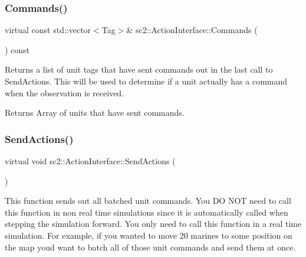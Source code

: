 \subsubsection{\texorpdfstring{Commands()}{Commands()}}
{\footnotesize\ttfamily virtual const std\+::vector$<$Tag$>$\& sc2\+::\+Action\+Interface\+::\+Commands (\begin{DoxyParamCaption}{ }\end{DoxyParamCaption}) const\hspace{0.3cm}{\ttfamily [pure virtual]}}

Returns a list of unit tags that have sent commands out in the last call to Send\+Actions. This will be used to determine if a unit actually has a command when the observation is received. \begin{DoxyReturn}{Returns}
Array of units that have sent commands. 
\end{DoxyReturn}
\mbox{\label{classsc2_1_1_action_interface_af054d2a35e7eb740109f63011090ea50}} 
\subsubsection{\texorpdfstring{Send\+Actions()}{SendActions()}}
{\footnotesize\ttfamily virtual void sc2\+::\+Action\+Interface\+::\+Send\+Actions (\begin{DoxyParamCaption}{ }\end{DoxyParamCaption})\hspace{0.3cm}{\ttfamily [pure virtual]}}

This function sends out all batched unit commands. You DO N\+OT need to call this function in non real time simulations since it is automatically called when stepping the simulation forward. You only need to call this function in a real time simulation. For example, if you wanted to move 20 marines to some position on the map you\textquotesingle{}d want to batch all of those unit commands and send them at once. \mbox{\label{classsc2_1_1_action_interface_a5f66f9b7eaf1d6a681694927b8605004}} 
